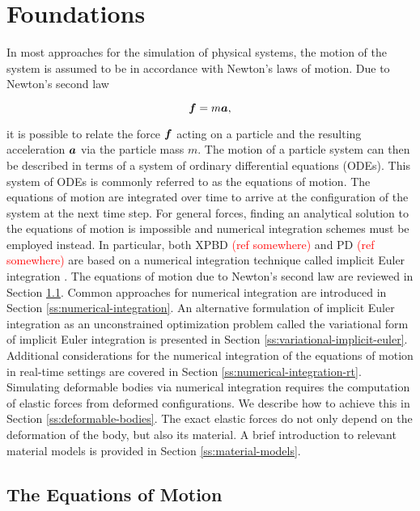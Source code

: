 \chapter{Foundations}\label{ch:foundations}

In most approaches for the simulation of physical systems, the motion of the system is assumed to be in accordance with Newton's laws of
motion. Due to Newton's second law 

\begin{equation}\label{newtons-laws-2}
    \bm{f} = m\bm{a},
\end{equation}

\noindent it is possible to relate the force $\bm{f}$ acting on a particle and the resulting acceleration $\bm{a}$ via the particle
mass $m$. The motion of a particle system can then be described in terms of a system of ordinary differential equations (ODEs). This
system of ODEs is commonly referred to as the equations of motion. The equations of motion are integrated over time to arrive 
at the configuration of the system at the next time step. For general forces, finding an analytical solution to the equations of motion
is impossible and numerical integration schemes must be employed instead. In particular, both XPBD \textcolor{red}{(ref somewhere)} 
and PD \textcolor{red}{(ref somewhere)} are based on a numerical integration technique called implicit Euler integration 
\cite{macklin2016, bouaziz2014}. The equations of motion due to Newton's second law are reviewed in Section \ref{s:equations-of-motion}. Common 
approaches for numerical integration are introduced in Section \ref{ss:numerical-integration}. An alternative formulation of implicit Euler integration 
as an unconstrained optimization problem called the variational form of implicit Euler integration is presented in Section \ref{ss:variational-implicit-euler}. 
Additional considerations for the numerical integration of the equations of motion in real-time settings are covered in 
Section \ref{ss:numerical-integration-rt}. Simulating deformable bodies via numerical integration requires the computation of elastic forces from 
deformed configurations. We describe how to achieve this in Section \ref{ss:deformable-bodies}. The exact elastic forces do not only depend on 
the deformation of the body, but also its material. A brief introduction to relevant material models is provided in Section \ref{ss:material-models}.

\section{The Equations of Motion}\label{s:equations-of-motion}

